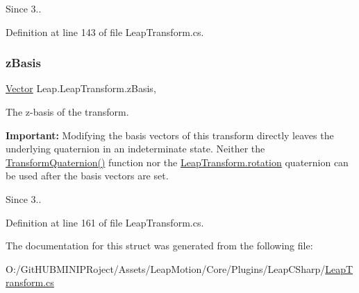 \begin{DoxySince}{Since}
3.. 
\end{DoxySince}


Definition at line 143 of file Leap\+Transform.\+cs.

\mbox{\label{struct_leap_1_1_leap_transform_a59e5ecf307c5938bf9e04902b8395f8a}} 
\subsubsection{\texorpdfstring{zBasis}{zBasis}}
{\footnotesize\ttfamily \mbox{\hyperlink{struct_leap_1_1_vector}{Vector}} Leap.\+Leap\+Transform.\+z\+Basis\hspace{0.3cm}{\ttfamily [get]}, {\ttfamily [set]}}



The z-\/basis of the transform. 

{\bfseries{Important\+:}} Modifying the basis vectors of this transform directly leaves the underlying quaternion in an indeterminate state. Neither the \mbox{\hyperlink{struct_leap_1_1_leap_transform_ad9658850a91beef88214dcaac6f6e6af}{Transform\+Quaternion()}} function nor the \mbox{\hyperlink{struct_leap_1_1_leap_transform_a69917840386ec2421d3886be4ec7833a}{Leap\+Transform.\+rotation}} quaternion can be used after the basis vectors are set.

\begin{DoxySince}{Since}
3.. 
\end{DoxySince}


Definition at line 161 of file Leap\+Transform.\+cs.



The documentation for this struct was generated from the following file\+:\begin{DoxyCompactItemize}
\item 
O\+:/\+Git\+H\+U\+B\+M\+I\+N\+I\+P\+Roject/\+Assets/\+Leap\+Motion/\+Core/\+Plugins/\+Leap\+C\+Sharp/\mbox{\hyperlink{_leap_transform_8cs}{Leap\+Transform.\+cs}}\end{DoxyCompactItemize}
